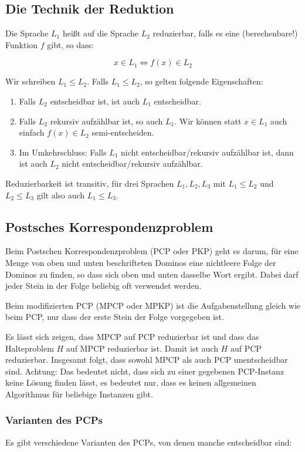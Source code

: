 \documentclass[a4paper,parskip=half*,DIV=7,fontsize=11pt]{scrartcl}
\begin{document}
\subsection{Die Technik der Reduktion}
\label{sec:reduktion}
Die Sprache $L_1$ heißt auf die Sprache $L_2$ reduzierbar, falls  es eine (berechenbare!) Funktion $f$ gibt, so dass:

\[x \in L_1 \iff f(x) \in L_2\]

Wir schreiben $L_1 \leq L_2$. Falls $L_1 \leq L_2$, so gelten folgende Eigenschaften:

\begin{enumerate}
\item Falls $L_2$ entscheidbar ist, ist auch $L_1$ entscheidbar.
\item  Falls $L_2$ rekursiv aufzählbar ist, so auch $L_1$. Wir können statt $x \in L_1$ auch einfach $f(x) \in L_2$ semi-entscheiden.
\item Im Umkehrschluss: Falls $L_1$ nicht entscheidbar/rekursiv aufzählbar ist, dann ist auch $L_2$ nicht entscheidbar/rekursiv aufzählbar.
\end{enumerate}

Reduzierbarkeit ist transitiv, für drei Sprachen $L_1,L_2,L_3$ mit $L_1\leq L_2$ und $L_2 \leq L_3$ gilt also auch $L_1\leq L_3$.

\subsection{Postsches Korrespondenzproblem}
Beim Postschen Korrespondenzproblem (PCP oder PKP) geht es darum, für eine Menge von oben und unten beschrifteten Dominos eine nichtleere Folge der Dominos zu finden, so dass sich oben und unten dasselbe Wort ergibt. Dabei darf jeder Stein in der Folge beliebig oft verwendet werden.

Beim modifizierten PCP (MPCP oder MPKP) ist die Aufgabenstellung gleich wie beim PCP, nur dass der erste Stein der Folge vorgegeben ist.

Es lässt sich zeigen, dass MPCP auf PCP reduzierbar ist und dass das Halteproblem $H$ auf MPCP reduzierbar ist. Damit ist auch $H$ auf PCP reduzierbar. Insgesamt folgt, dass sowohl MPCP als auch PCP unentscheidbar sind. Achtung: Das bedeutet nicht, dass sich zu einer gegebenen PCP-Instanz keine Lösung finden lässt, es bedeutet nur, dass es keinen allgemeinen Algorithmus für beliebige Instanzen gibt.

\subsubsection{Varianten des PCPs}
Es gibt verschiedene Varianten des PCPs, von denen manche entscheidbar sind:
\end{document}
